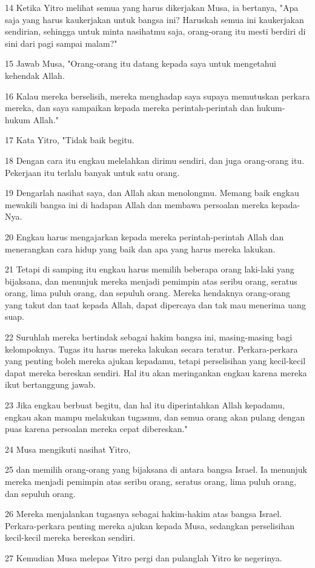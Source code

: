 \par 14 Ketika Yitro melihat semua yang harus dikerjakan Musa, ia bertanya, "Apa saja yang harus kaukerjakan untuk bangsa ini? Haruskah semua ini kaukerjakan sendirian, sehingga untuk minta nasihatmu saja, orang-orang itu mesti berdiri di sini dari pagi sampai malam?"
\par 15 Jawab Musa, "Orang-orang itu datang kepada saya untuk mengetahui kehendak Allah.
\par 16 Kalau mereka berselisih, mereka menghadap saya supaya memutuskan perkara mereka, dan saya sampaikan kepada mereka perintah-perintah dan hukum-hukum Allah."
\par 17 Kata Yitro, "Tidak baik begitu.
\par 18 Dengan cara itu engkau melelahkan dirimu sendiri, dan juga orang-orang itu. Pekerjaan itu terlalu banyak untuk satu orang.
\par 19 Dengarlah nasihat saya, dan Allah akan menolongmu. Memang baik engkau mewakili bangsa ini di hadapan Allah dan membawa persoalan mereka kepada-Nya.
\par 20 Engkau harus mengajarkan kepada mereka perintah-perintah Allah dan menerangkan cara hidup yang baik dan apa yang harus mereka lakukan.
\par 21 Tetapi di samping itu engkau harus memilih beberapa orang laki-laki yang bijaksana, dan menunjuk mereka menjadi pemimpin atas seribu orang, seratus orang, lima puluh orang, dan sepuluh orang. Mereka hendaknya orang-orang yang takut dan taat kepada Allah, dapat dipercaya dan tak mau menerima uang suap.
\par 22 Suruhlah mereka bertindak sebagai hakim bangsa ini, masing-masing bagi kelompoknya. Tugas itu harus mereka lakukan secara teratur. Perkara-perkara yang penting boleh mereka ajukan kepadamu, tetapi perselisihan yang kecil-kecil dapat mereka bereskan sendiri. Hal itu akan meringankan engkau karena mereka ikut bertanggung jawab.
\par 23 Jika engkau berbuat begitu, dan hal itu diperintahkan Allah kepadamu, engkau akan mampu melakukan tugasmu, dan semua orang akan pulang dengan puas karena persoalan mereka cepat dibereskan."
\par 24 Musa mengikuti nasihat Yitro,
\par 25 dan memilih orang-orang yang bijaksana di antara bangsa Israel. Ia menunjuk mereka menjadi pemimpin atas seribu orang, seratus orang, lima puluh orang, dan sepuluh orang.
\par 26 Mereka menjalankan tugasnya sebagai hakim-hakim atas bangsa Israel. Perkara-perkara penting mereka ajukan kepada Musa, sedangkan perselisihan kecil-kecil mereka bereskan sendiri.
\par 27 Kemudian Musa melepas Yitro pergi dan pulanglah Yitro ke negerinya.

